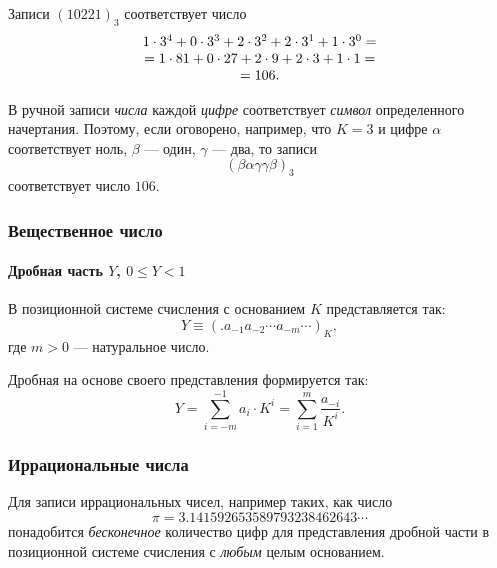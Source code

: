 \begin{frame}
    \begin{example}
        Записи $(10221)_{3}$  соответствует число
        \[
            \begin{array}[c]{c}
                1\cdot 3^{4}+
                0\cdot 3^{3}+
                2\cdot 3^{2}+
                2\cdot 3^{1}+
                1\cdot 3^{0} = \\
                =1\cdot 81+
                0\cdot 27+
                2\cdot 9+
                2\cdot 3+
                1\cdot 1 = \\
                = 106.
            \end{array}
        \]
    \end{example}
\end{frame}

\begin{frame}
    \begin{example}
        В ручной записи \emph{числа} каждой \emph{цифре} соответствует \emph{символ} определенного начертания. Поэтому, если оговорено, например, что $K=3$ и цифре
        $\alpha$ соответствует ноль, $\beta$ --- один, $\gamma$ --- два, то записи 
        \[
            (\beta\alpha\gamma\gamma\beta)_3
        \]
        соответствует число $106$. 
    \end{example}
\end{frame}


\begin{frame}
    \frametitle{Вещественное число}
    \framesubtitle{Дробная часть $Y$, $0\leq Y < 1$}
    
    В позиционной системе счисления с основанием $K$ представляется так:
    \[
        Y\equiv(.a_{-1}a_{-2}\cdots a_{-m}\cdots)_K,
    \] где $m>0$ --- натуральное число.

    Дробная на основе своего представления формируется так:
    \[
        Y=
            \sum_{i=-m}^{-1}a_{i}\cdot K^{i}=
            \sum_{i=1}^{m}\frac{a_{-i}}{K^{i}}.
    \]
\end{frame}

\begin{frame}
    \frametitle{Иррациональные числа}
    
    Для записи иррациональных чисел, например таких, как число 
    \[\pi=3.141592653589793238462643\cdots\] 
    понадобится \emph{бесконечное} количество цифр для представления дробной части в позиционной системе счисления с \emph{любым} целым основанием.
\end{frame}

